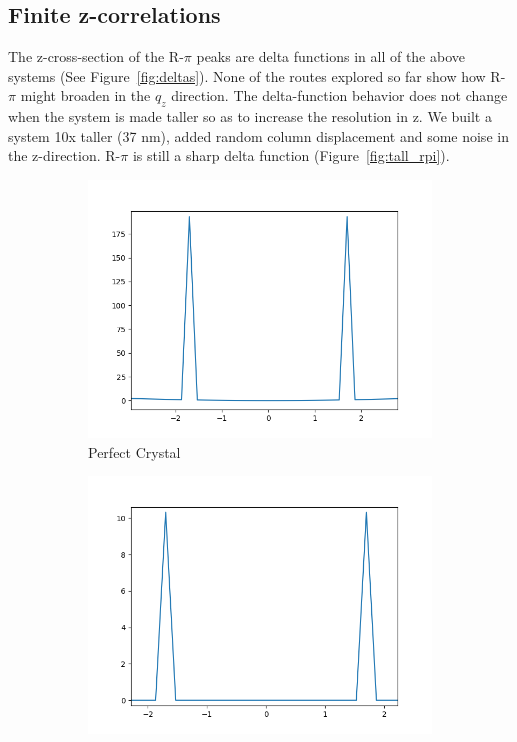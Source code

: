 \documentclass{article}
\begin{document}
  \subsection{Finite z-correlations}

  The z-cross-section of the R-$\pi$ peaks are delta functions in all of the
  above systems (See Figure~\ref{fig:deltas}). None of the routes explored so far
  show how R-$\pi$ might broaden in the $q_z$ direction. The delta-function
  behavior does not change when the system is made taller so as to increase the
  resolution in z. We built a system 10x taller (37 nm), added random column
  displacement and some noise in the z-direction. R-$\pi$ is still a sharp delta
  function (Figure~\ref{fig:tall_rpi}). 

  \begin{figure}
  \centering
  \begin{subfigure}{0.45\textwidth}
  \includegraphics[width=\textwidth]{perfect_rpi.png}
  \caption{Perfect Crystal}\label{fig:perfect_rpi}
  \end{subfigure}
  \begin{subfigure}{0.45\textwidth}
  \includegraphics[width=\textwidth]{displace_columns_rpi.png}

\end{subfigure}
\end{figure}
\end{document}

